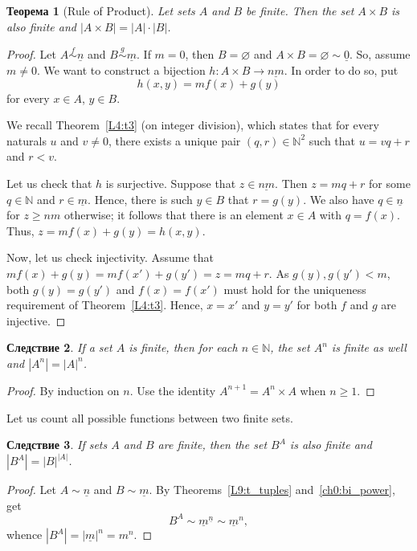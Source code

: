 \documentclass[12pt,notitlepage]{article}
\theoremstyle{plain}
\newtheorem{thm}{Теорема}[section]
\newtheorem{corr}[thm]{Следствие}
\theoremstyle{definition}
\theoremstyle{plain}
\newcommand{\N}{\mathbb{N}}
\newcommand{\void}{\varnothing}
\newcommand{\ul}[1]{\underline{#1}}
\newcommand{\1}{\mathbf{1}}
\newcommand{\0}{\mathbf{0}}
\begin{document}
\begin{thm}[Rule of Product]\label{prod}
	Let sets $A$ and $B$ be finite. Then the set $A \times B$ is also finite and $|A \times B| = |A| \cdot |B|$.
\end{thm}
\begin{proof}
	Let $A \stackrel{f}{\sim} \ul{n}$ and $B \stackrel{g}{\sim} \ul{m}$. If $m = 0$, then $B = \void$ and $A \times B = \void \sim \ul{0}$. So, assume $m \neq 0$. We want to construct a bijection $h\colon A \times B \to \ul{nm}$. In order to do so, put
	$$h(x, y) = mf(x) + g(y)$$
	for every $x \in A$, $y\in B$.
	
	We recall Theorem~\ref{L4:t3} (on integer division), which states that for every naturals $u$ and $v \neq 0$, there exists a unique pair  $(q,r) \in \N^2$ such that $u = vq + r$ and $r < v$.
	
	Let us check that $h$ is surjective. Suppose that $z \in \ul{nm}$. Then $z = mq + r$ for some $q \in \N$ and $r \in \ul{m}$. Hence, there is such $y \in B$ that $r = g(y)$. We also have $q \in \ul{n}$ for $z \geq nm$ otherwise; it follows that there is an element $x \in A$ with $q = f(x)$. Thus, $z = mf(x) + g(y) = h(x, y)$.
	
	Now, let us check injectivity. Assume that $mf(x) + g(y) = mf(x') + g(y') = z = mq + r$. As $g(y), g(y') < m$, both $g(y) =  g(y')$ and $f(x) = f(x')$ must hold for the uniqueness requirement of Theorem~\ref{L4:t3}. Hence, $x = x'$ and $y = y'$ for both $f$ and $g$ are injective.
\end{proof}

\begin{corr}\label{L10:num_tuple}
	If a set $A$ is finite, then for each $n \in \N$, the set $A^n$ is finite as well and $|A^n| = |A|^n$.
\end{corr}
\begin{proof}
	By induction on $n$. Use the identity $A^{n+1} = A^n \times A$ when $n \geq 1$.
\end{proof}

Let us count all possible functions between two finite sets.
\begin{corr}\label{L10:num_func}
	If sets $A$ and $B$ are finite, then the set $B^A$ is also finite and $|B^A| = |B|^{|A|}$.
\end{corr}
\begin{proof}
	Let $A \sim \ul{n}$ and $B \sim \ul{m}$. By Theorems~\ref{L9:t_tuples} and~\ref{ch0:bi_power}, get
	$$B^A \sim \ul{m}^{\ul{n}} \sim \ul{m}^n,$$
	whence $|B^A| = |\ul{m}|^n = m^n$.
\end{proof}
\end{document}
